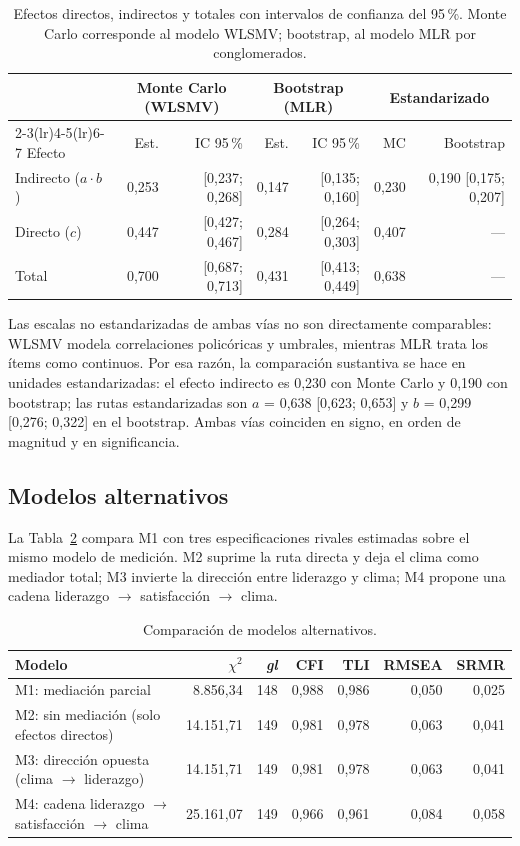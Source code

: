 \documentclass[11pt,a4paper]{article}
\newcommand{\chisq}{$\chi^2$}
\newcommand{\df}{\textit{gl}}
\begin{document}
\begin{table}[htbp]
\centering
\caption{Efectos directos, indirectos y totales con intervalos de confianza del 95\,\%.
Monte Carlo corresponde al modelo WLSMV; bootstrap, al modelo MLR por conglomerados.}
\label{tab:efectos}
\small
\begin{tabular}{@{}lrrrrrr@{}}
\toprule
 & \multicolumn{2}{c}{Monte Carlo (WLSMV)} & \multicolumn{2}{c}{Bootstrap (MLR)} & \multicolumn{2}{c}{Estandarizado} \\
\cmidrule(lr){2-3}\cmidrule(lr){4-5}\cmidrule(lr){6-7}
Efecto & Est. & IC 95\,\% & Est. & IC 95\,\% & MC & Bootstrap \\
\midrule
Indirecto ($a\cdot b$) & 0,253 & [0,237; 0,268] & 0,147 & [0,135; 0,160] & 0,230 & 0,190 [0,175; 0,207] \\
Directo ($c$) & 0,447 & [0,427; 0,467] & 0,284 & [0,264; 0,303] & 0,407 & --- \\
Total & 0,700 & [0,687; 0,713] & 0,431 & [0,413; 0,449] & 0,638 & --- \\
\bottomrule
\end{tabular}
\end{table}

Las escalas no estandarizadas de ambas vías no son directamente comparables: WLSMV modela
correlaciones policóricas y umbrales, mientras MLR trata los ítems como continuos. Por esa
razón, la comparación sustantiva se hace en unidades estandarizadas: el efecto indirecto es
0,230 con Monte Carlo y 0,190 con bootstrap; las rutas estandarizadas son $a$ = 0,638
[0,623; 0,653] y $b$ = 0,299 [0,276; 0,322] en el bootstrap. Ambas vías coinciden en signo,
en orden de magnitud y en significancia.

\subsection{Modelos alternativos}

La Tabla~\ref{tab:alternativos} compara M1 con tres especificaciones rivales estimadas sobre
el mismo modelo de medición. M2 suprime la ruta directa y deja el clima como mediador total;
M3 invierte la dirección entre liderazgo y clima; M4 propone una cadena
liderazgo $\rightarrow$ satisfacción $\rightarrow$ clima.

\begin{table}[htbp]
\centering
\caption{Comparación de modelos alternativos.}
\label{tab:alternativos}
\small
\begin{tabular}{@{}lrrrrrr@{}}
\toprule
Modelo & \chisq & \df & CFI & TLI & RMSEA & SRMR \\
\midrule
M1: mediación parcial & 8.856,34 & 148 & 0,988 & 0,986 & 0,050 & 0,025 \\
M2: sin mediación (solo efectos directos) & 14.151,71 & 149 & 0,981 & 0,978 & 0,063 & 0,041 \\
M3: dirección opuesta (clima $\rightarrow$ liderazgo) & 14.151,71 & 149 & 0,981 & 0,978 & 0,063 & 0,041 \\
M4: cadena liderazgo $\rightarrow$ satisfacción $\rightarrow$ clima & 25.161,07 & 149 & 0,966 & 0,961 & 0,084 & 0,058 \\
\bottomrule
\end{tabular}
\end{table}
\end{document}
